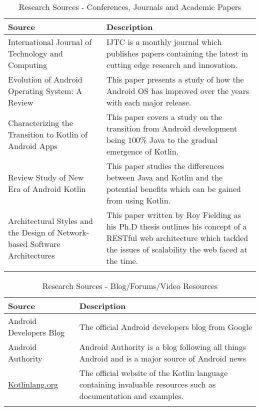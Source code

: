 \begin{longtable}{ |p{4cm}|p{10cm}|  }
		\hline
		\hline
		\textbf{Source} & \textbf{Description} \\
		\hline
		International Journal of Technology and Computing & IJTC\cite{ijtcref} is a monthly journal which publishes papers containing the latest in cutting edge research and innovation. \\
		\hline
		Evolution of Android Operating System: A Review & This paper presents a study of how the Android OS has improved over the years with each major release\cite{evolutionofandroidreview}. \\
		\hline
		Characterizing the Transition to Kotlin of Android Apps & This paper covers a study on the transition from Android development being 100\% Java to the gradual emergence of Kotlin\cite{androidkotlinstudy}.\\
		\hline
		Review Study of New Era of Android Kotlin & This paper studies the differences between Java and Kotlin and the potential benefits which can be gained from using Kotlin\cite{reviewonandroidkotlin}.\\
		\hline
		Architectural Styles and the Design of Network-based Software Architectures & This paper written by Roy Fielding as his Ph.D thesis outlines his concept of a RESTful web architecture which tackled the issues of scalability the web faced at the time\cite{restphdthesis}.\\
		\hline
    \caption{Research Sources - Conferences, Journals and Academic Papers}
	\label{conferencesandjournalstable}
\end{longtable}

\begin{longtable}{ |p{4cm}|p{10cm}|  }
		\hline
		\hline
		\textbf{Source} & \textbf{Description} \\
		\hline
		Android Developers Blog & The official Android developers blog from Google\cite{androiddevblogref}\\
		\hline
		Android Authority & Android Authority\cite{androidauthorityref} is a blog following all things Android and is a major source of Android news\\
		\hline
		\url{Kotlinlang.org} & The official website of the Kotlin language containing invaluable resources such as documentation and examples\cite{Kotlinref}.\\
		\hline
    \caption{Research Sources - Blog/Forums/Video Resources}
	\label{blogsandforumstable}
\end{longtable}

